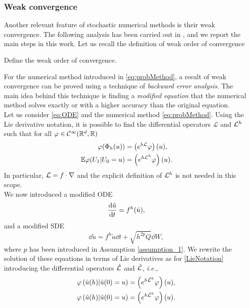 \subsubsection{Weak convergence}

Another relevant feature of stochastic numerical methods is their weak convergence. The following analysis has been carried out in \cite{CGS16}, and we report the main steps in this work. Let us recall the definition of weak order of convergence
\begin{definition} Define the weak order of convergence. 
\end{definition}
\noindent For the numerical method introduced in \eqref{eq:probMethod}, a result of weak convergence can be proved using a technique of \textit{backward error analysis}. The main idea behind this technique is finding a \textit{modified equation} that the numerical method solves exactly or with a higher accuracy than the original equation. \\
Let us consider \eqref{eq:ODE} and the numerical method \eqref{eq:probMethod}. Using the Lie derivative notation, it is possible to find the differential operators $\mathcal{L}$ and $\mathcal{L}^h$ such that for all $\varphi \in \mathcal{C}^\infty(\mathbb{R}^d, \mathbb{R})$ 
\begin{equation}\label{LieNotation}
\begin{aligned}
	\varphi(\Phi_h(u)) &= \left(e^{h\mathcal{L}} \varphi\right)(u), \\
	\mathbb{E}\varphi(U_1 | U_0 = u) &= \left(e^{h\mathcal{L}^h}\varphi\right)(u).
\end{aligned}
\end{equation}
In particular, $\mathcal{L} = f \cdot \nabla$ and the explicit definition of $\mathcal{L}^h$ is not needed in this scope. \\
We now introduced a modified ODE
\begin{equation}\label{modifiedODE}
	\dv{\hat u}{t} = f^h(\hat u), 
\end{equation}
and a modified SDE
\begin{equation}\label{modifiedSDE}
	\dd{\tilde u} = f^h{\tilde u}\dd{t} + \sqrt{h^{2p} Q} \dd{W},
\end{equation}
where $p$ has been introduced in Assumption \ref{assumption_1}. We rewrite the solution of these equations in terms of Lie derivatives as for \eqref{LieNotation} introducing the differential operators $\hat {\mathcal{L}}$ and $\tilde {\mathcal{L}}$, \textit{i.e.},
\begin{equation}\label{LieNotationModif}
\begin{aligned}
	\varphi\left(\hat u(h) | \hat u(0) = u\right) &= \left(e^{h\hat{\mathcal{L}}^h}\varphi\right)(u), \\
	\varphi\left(\tilde u(h)|\tilde u(0) = u\right) &= \left(e^{h\tilde{\mathcal{L}}^h}\varphi\right)(u).
\end{aligned}
\end{equation}
